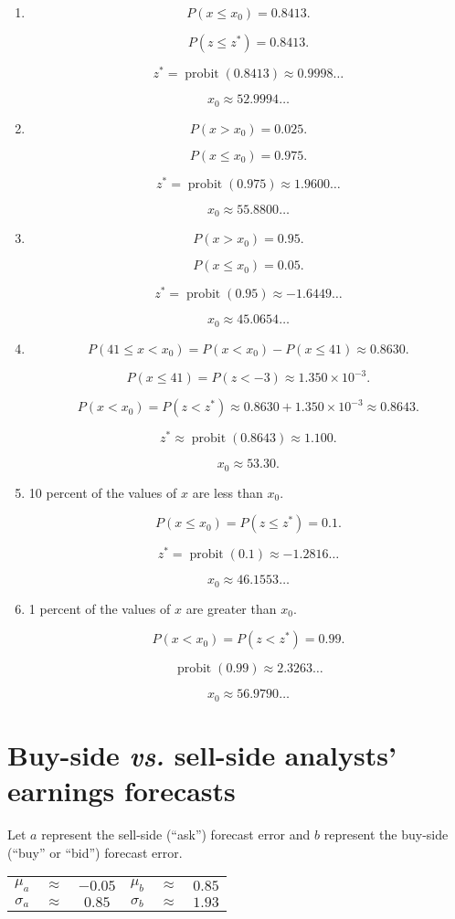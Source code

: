 \documentclass[12pt]{article}
\DeclareMathOperator{\probit}{probit}
\begin{document}
\begin{enumerate}
\item
\[P(x\leq x_0)=0.8413.\]

\[P(z\leq z^*)=0.8413.\]

\[z^*=\probit(0.8413)\approx 0.9998\dots\]

\[x_0\approx 52.9994\dots\]
\item
\[P(x>x_0)=0.025.\]

\[P(x\leq x_0)=0.975.\]

\[z^*=\probit(0.975)\approx 1.9600\dots\]

\[x_0\approx 55.8800\dots\]
\item
\[P(x>x_0)=0.95.\]

\[P(x\leq x_0)=0.05.\]

\[z^*=\probit(0.95)\approx -1.6449\dots\]

\[x_0\approx 45.0654\dots\]
\item
\[P(41\leq x<x_0)=P(x<x_0)-P(x\leq 41)\approx 0.8630.\]

\[P(x\leq 41)=P(z<-3)\approx 1.350\times 10^{-3}.\]

\[P(x<x_0)=P(z<z^*)\approx 0.8630+1.350\times 10^{-3}\approx 0.8643.\]

\[z^*\approx\probit(0.8643)\approx 1.100.\]

\[x_0\approx 53.30.\]
\item 10 percent of the values of $x$ are less than $x_0$.

\[P(x\leq x_0)=P(z\leq z^*)=0.1.\]

\[z^*=\probit(0.1)\approx -1.2816\dots\]

\[x_0\approx 46.1553\dots\]
\item 1 percent of the values of $x$ are greater than $x_0$.

\[P(x<x_0)=P(z<z^*)=0.99.\]

\[\probit(0.99)\approx 2.3263\dots\]

\[x_0\approx 56.9790\dots\]
\end{enumerate}
\section{Buy-side \emph{vs.} sell-side analysts' earnings forecasts}
Let $a$ represent the sell-side (``ask'') forecast error and $b$ represent the buy-side (``buy'' or ``bid'') forecast error.

\begin{center}
\begin{tabular}{cccccc}
$\mu_a$&$\approx$&$-0.05$&$\mu_b$&$\approx$&$0.85$\\

$\sigma_a$&$\approx$&$0.85$&$\sigma_b$&$\approx$&$1.93$
\end{tabular}
\end{center}
\end{document}
